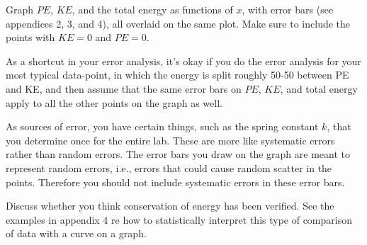 \analysis

Graph $PE$, $KE$, and the total energy as functions of $x$,
with error bars (see appendices 2, 3, and 4), all overlaid
on the same plot. Make sure to include the points with $KE=0$ and
$PE=0$.

As a shortcut in your error analysis, it's okay if you
do the error analysis for your most typical data-point, in which
the energy is split roughly 50-50 between PE and KE, and then assume
that the same error bars on $PE$, $KE$, and total energy apply to
all the other points on the graph as well.

As sources of error, you have certain things, such as the spring constant $k$,
that you determine once for the entire lab. These are more like systematic
errors rather than random errors. The error bars you draw on the graph are
meant to represent random errors, i.e., errors that could cause random scatter
in the points. Therefore you should not include systematic errors in these
error bars.

Discuss whether you think conservation of
energy has been verified. See the examples in appendix 4 re how to statistically interpret
this type of comparison of data with a curve on a graph.

